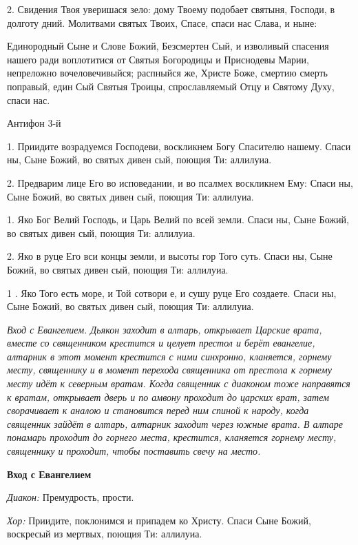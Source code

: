  2. Свидения Твоя уверишася зело: дому Твоему подобает святыня, Господи, в долготу дний. Молитвами святых Твоих, Спасе, спаси нас Слава, и ныне: 


 Единородный Сыне и Слове Божий, Безсмертен Сый, и изволивый спасения нашего ради воплотитися от Святыя Богородицы и Приснодевы Марии, непреложно вочеловечивыйся; распныйся же, Христе Боже, смертию смерть поправый, един Сый Святыя Троицы, спрославляемый Отцу и Святому Духу, спаси нас. 

\medskip Антифон 3-й 

 1. Приидите возрадуемся Господеви, воскликнем Богу Спасителю нашему. Спаси ны, Сыне Божий, во святых дивен сый, поющия Ти: аллилуиа. 

 2. Предварим лице Его во исповедании, и во псалмех воскликнем Ему: Спаси ны, Сыне Божий, во святых дивен сый, поющия Ти: аллилуиа. 

 1. Яко Бог Велий Господь, и Царь Велий по всей земли. Спаси ны, Сыне Божий, во святых дивен сый, поющия Ти: аллилуиа. 

 2. Яко в руце Его вси концы земли, и высоты гор Того суть. Спаси ны, Сыне Божий, во святых дивен сый, поющия Ти: аллилуиа. 

 1 . Яко Того есть море, и Той сотвори е, и сушу руце Его создаете. Спаси ны, Сыне Божий, во святых дивен сый, поющия Ти: аллилуиа. 

 {\itshape Вход с Евангелием. Дьякон заходит в алтарь, открывает Царские врата, вместе со священником крестится и целует престол и берёт евангелие, алтарник в этот момент крестится с ними синхронно, кланяется, горнему месту, священнику и в момент перехода священника от престола к горнему месту идёт к северным вратам. Когда священник с диаконом тоже направятся к вратам, открывает дверь и по амвону проходит до царских врат, затем сворачивает к аналою и становится перед ним спиной к народу, когда священник зайдёт в алтарь, алтарник заходит через южные врата. В алтаре понамарь проходит до горнего места, крестится, кланяется горнему месту, священнику и проходит, чтобы поставить свечу на место.} 

\medskip 

{\bfseries Вход с Евангелием }

 {\itshape Диакон:} Премудрость, прости.

 {\itshape  Хор:} Приидите, поклонимся и припадем ко Христу. Спаси Сыне Божий, воскресый из мертвых, поющия Ти: аллилуиа.

